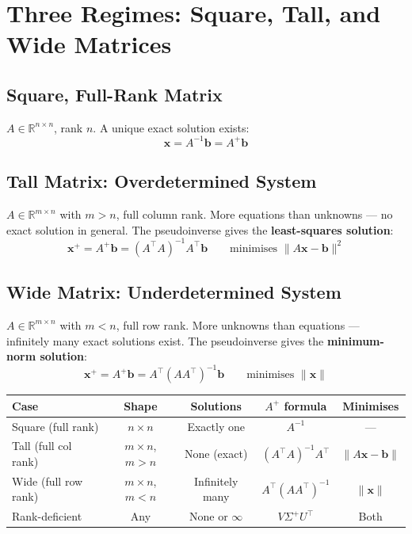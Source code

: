 \documentclass[12pt, a4paper]{article}
\theoremstyle{definition}
\begin{document}
\section{Three Regimes: Square, Tall, and Wide Matrices}

\subsection{Square, Full-Rank Matrix}

$A \in \mathbb{R}^{n \times n}$, rank $n$. A unique exact solution exists:
\[
    \mathbf{x} = A^{-1}\mathbf{b} = A^+\mathbf{b}
\]

\subsection{Tall Matrix: Overdetermined System}

$A \in \mathbb{R}^{m \times n}$ with $m > n$, full column rank. More equations than unknowns — no exact solution in general. The pseudoinverse gives the \textbf{least-squares solution}:
\[
    \mathbf{x}^+ = A^+\mathbf{b} = (A^\top A)^{-1} A^\top \mathbf{b}
    \qquad \text{minimises } \|A\mathbf{x} - \mathbf{b}\|^2
\]

\subsection{Wide Matrix: Underdetermined System}

$A \in \mathbb{R}^{m \times n}$ with $m < n$, full row rank. More unknowns than equations — infinitely many exact solutions exist. The pseudoinverse gives the \textbf{minimum-norm solution}:
\[
    \mathbf{x}^+ = A^+\mathbf{b} = A^\top(AA^\top)^{-1}\mathbf{b}
    \qquad \text{minimises } \|\mathbf{x}\|
\]

\begin{center}
\renewcommand{\arraystretch}{1.5}
\begin{tabular}{lcccc}
    \toprule
    \textbf{Case} & \textbf{Shape} & \textbf{Solutions} & \textbf{$A^+$ formula} & \textbf{Minimises} \\
    \midrule
    Square (full rank) & $n \times n$ & Exactly one & $A^{-1}$ & --- \\
    Tall (full col rank) & $m \times n$, $m > n$ & None (exact) & $(A^\top A)^{-1}A^\top$ & $\|A\mathbf{x}-\mathbf{b}\|$ \\
    Wide (full row rank) & $m \times n$, $m < n$ & Infinitely many & $A^\top(AA^\top)^{-1}$ & $\|\mathbf{x}\|$ \\
    Rank-deficient & Any & None or $\infty$ & $V\Sigma^+U^\top$ & Both \\
    \bottomrule
\end{tabular}
\end{center}
\end{document}

